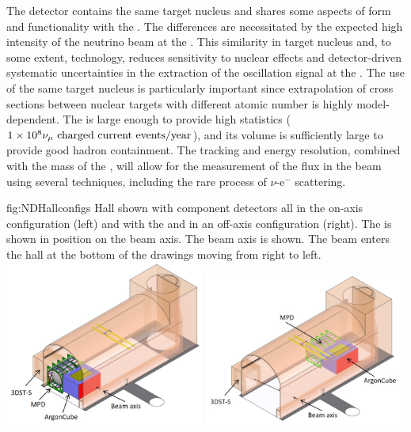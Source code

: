 The  detector contains the same target nucleus and shares some aspects of form and functionality with the . The differences are necessitated by the expected high intensity of the neutrino beam at the .  This similarity in target nucleus and, to some extent, technology, reduces sensitivity to nuclear effects and detector-driven systematic uncertainties in the extraction of the oscillation signal at the  . The use of the same target nucleus is particularly important since extrapolation of cross sections between nuclear targets with different atomic number is highly model-dependent. The  is large enough to provide high statistics ($\num{1e8}{\numu \text{ charged current events/year}}$), and its volume is sufficiently large to provide good hadron containment.  The tracking and energy resolution, combined with the mass of the , will allow for the measurement of the flux in the beam using several techniques, including the rare process of $\nu$-e$^{-}$ scattering.

\begin{dunefigure}
{fig:NDHallconfigs}
{  Hall shown with component detectors all in the on-axis configuration (left) and with the  and  in an off-axis configuration (right). The  is shown in position on the beam axis. The beam axis is shown.  The beam enters the hall at the bottom of the drawings moving from right to left.}
\includegraphics[width=0.49\textwidth]{graphics/NDHall_onaxis.jpg}
\includegraphics[width=0.49\textwidth]{graphics/NDHall_offaxis.jpg}
\end{dunefigure}

